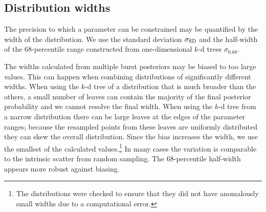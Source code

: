 \subsection{Distribution widths}

The precision to which a parameter can be constrained may be quantified by the width of the distribution. We use the standard deviation $\sigma_\mathrm{SD}$ and the half-width of the $68$-percentile range constructed from one-dimensional $k$-d trees $\sigma_{0.68}$.

The widths calculated from multiple burst posteriors may be biased to too large values. This can happen when combining distributions of significantly different widths. When using the $k$-d tree of a distribution that is much broader than the others, a small number of leaves can contain the majority of the final posterior probability and we cannot resolve the final width. When using the $k$-d tree from a narrow distribution there can be large leaves at the edges of the parameter ranges; because the resampled points from these leaves are uniformly distributed they can skew the overall distribution. Since the bias increases the width, we use the smallest of the calculated values.\footnote{The distributions were checked to ensure that they did not have anomalously small widths due to a computational error.}
In many cases the variation is comparable to the intrinsic scatter from random sampling. The $68$-percentile half-width appears more robust against biasing.

